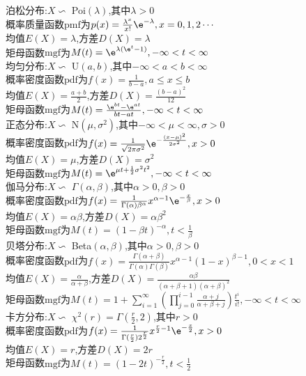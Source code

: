 泊松分布:$X\backsim$ Poi$(\lambda)$,其中$\lambda>0$\\
概率质量函数$\mathrm{pmf}$为$p(x)=\frac{\lambda^x}{x!}\e^{-\lambda},x=0,1,2\cdots$\\
均值$E(X)=\lambda$,方差$D(X)=\lambda$\\
矩母函数$\mathrm{mgf}$为$M(t)=\e^{\lambda(\e^t-1)},-\infty<t<\infty$\\

均匀分布:$X\backsim$ U$(a,b)$,其中$-\infty<a<b<\infty$\\
概率密度函数$\mathrm{pdf}$为$f(x)=\frac{1}{b-a},a\leq x\leq b$\\
均值$E(X)=\frac{a+b}{2}$,方差$D(X)=\frac{(b-a)^2}{12}$\\
矩母函数$\mathrm{mgf}$为$M(t)=\frac{\e^{bt}-\e^{at}}{bt-at},-\infty<t<\infty$\\

正态分布:$X\backsim$ N$(\mu,\sigma^2)$,其中$-\infty<\mu<\infty,\sigma>0$\\
概率密度函数$\mathrm{pdf}$为$f(x)=\frac{1}{\sqrt{2\pi\sigma^2}}\e^{-\frac{(x-\mu)^2}{2\sigma^2}},x>0$\\
均值$E(X)=\mu$,方差$D(X)=\sigma^2$\\
矩母函数$\mathrm{mgf}$为$M(t)=\e^{\mu t+\frac{1}{2}\sigma^2 t^2},-\infty<t<\infty$\\

伽马分布:$X\backsim$ $\Gamma(\alpha,\beta)$,其中$\alpha>0,\beta>0$\\
概率密度函数$\mathrm{pdf}$为$f(x)=\frac{1}{\Gamma(\alpha)\beta^{\alpha}}x^{\alpha-1}\e^{-\frac{x}{\beta}},x>0$\\
均值$E(X)=\alpha\beta$,方差$D(X)=\alpha\beta^2$\\
矩母函数$\mathrm{mgf}$为$M(t)=(1-\beta t)^{-\alpha},t<\frac{1}{\beta}$\\

贝塔分布:$X\backsim$ Beta$(\alpha,\beta)$,其中$\alpha>0,\beta>0$\\
概率密度函数$\mathrm{pdf}$为$f(x)=\frac{\Gamma(\alpha+\beta)}{\Gamma(\alpha)\Gamma(\beta)}x^{\alpha-1}(1-x)^{\beta-1},0<x<1$\\
均值$E(X)=\frac{\alpha}{\alpha+\beta}$,方差$D(X)=\frac{\alpha\beta}{(\alpha+\beta+1)(\alpha+\beta)^2}$\\
矩母函数$\mathrm{mgf}$为$M(t)=1+\sum\limits_{i=1}^{\infty}(\prod\limits_{j=0}^{i-1}\frac{\alpha+j}{\alpha+\beta+j})\frac{t^i}{i!},-\infty<t<\infty$\\

卡方分布:$X\backsim$ $\chi^2(r)=\Gamma(\frac{r}{2},2)$,其中$r>0$\\
概率密度函数$\mathrm{pdf}$为$f(x)=\frac{1}{\Gamma(\frac{r}{2})2^{\frac{r}{2}}}x^{\frac{r}{2}-1}\e^{-\frac{x}{2}},x>0$\\
均值$E(X)=r$,方差$D(X)=2r$\\
矩母函数$\mathrm{mgf}$为$M(t)=(1-2t)^{-\frac{r}{2}},t<\frac{1}{2}$\\

